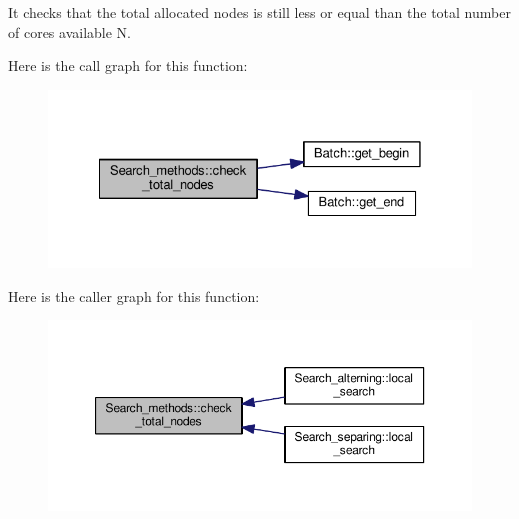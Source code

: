 It checks that the total allocated nodes is still less or equal than the total number of cores available N. 



Here is the call graph for this function\-:\nopagebreak
\begin{figure}[H]
\begin{center}
\leavevmode
\includegraphics[width=328pt]{classSearch__methods_adfd0c4197217dcf34a06353c3ba4f253_cgraph}
\end{center}
\end{figure}




Here is the caller graph for this function\-:\nopagebreak
\begin{figure}[H]
\begin{center}
\leavevmode
\includegraphics[width=350pt]{classSearch__methods_adfd0c4197217dcf34a06353c3ba4f253_icgraph}
\end{center}
\end{figure}


